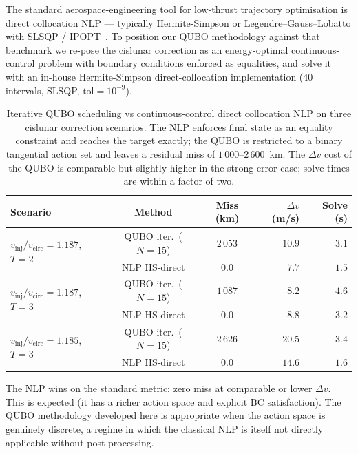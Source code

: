 \documentclass[11pt,a4paper]{article}
\theoremstyle{plain}
\begin{document}
The standard aerospace-engineering tool for low-thrust trajectory
optimisation is direct collocation NLP --- typically Hermite-Simpson
or Legendre--Gauss--Lobatto with SLSQP /
IPOPT~\cite{Kelly2017,Betts2010}. To position our
QUBO methodology against that benchmark we re-pose the cislunar
correction as an energy-optimal continuous-control problem with
boundary conditions enforced as equalities, and solve it with an
in-house Hermite-Simpson direct-collocation implementation
(40 intervals, SLSQP, $\mathrm{tol} = 10^{-9}$).

\begin{table}[htbp]
\centering
\begin{tabular}{lccrr}
\toprule
Scenario & Method & Miss (km) & $\Delta v$ (m/s) & Solve (s) \\
\midrule
\multirow{2}{*}{$v_\mathrm{inj}/v_\mathrm{circ}=1.187$, $T=2$}
  & QUBO iter.\ ($N{=}15$) & $2\,053$ & $10.9$ & $3.1$ \\
  & NLP HS-direct & $0.0$ & $7.7$ & $1.5$ \\
\multirow{2}{*}{$v_\mathrm{inj}/v_\mathrm{circ}=1.187$, $T=3$}
  & QUBO iter.\ ($N{=}15$) & $1\,087$ & $8.2$ & $4.6$ \\
  & NLP HS-direct & $0.0$ & $8.8$ & $3.2$ \\
\multirow{2}{*}{$v_\mathrm{inj}/v_\mathrm{circ}=1.185$, $T=3$}
  & QUBO iter.\ ($N{=}15$) & $2\,626$ & $20.5$ & $3.4$ \\
  & NLP HS-direct & $0.0$ & $14.6$ & $1.6$ \\
\bottomrule
\end{tabular}
\caption{Iterative QUBO scheduling vs continuous-control direct
collocation NLP on three cislunar correction scenarios. The NLP
enforces final state as an equality constraint and reaches the
target exactly; the QUBO is restricted to a binary tangential
action set and leaves a residual miss of $1\,000$--$2\,600$~km.
The $\Delta v$ cost of the QUBO is comparable but slightly higher
in the strong-error case; solve times are within a factor of two.}
\label{tab:nlp-vs-qubo}
\end{table}

The NLP wins on the standard metric: zero miss at comparable or
lower $\Delta v$. This is expected (it has a richer action
space and explicit BC
satisfaction). The QUBO methodology developed here is appropriate when the
action space is genuinely discrete, a regime in which the
classical NLP is itself not directly applicable without
post-processing.
\end{document}
